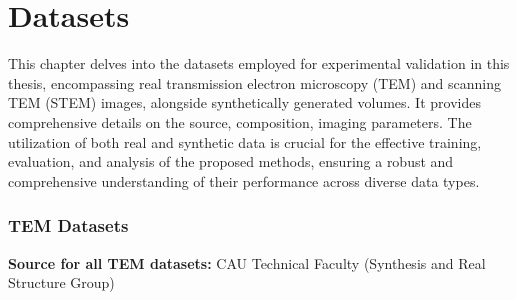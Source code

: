 \chapter{Datasets}\label{ch:Datasets}


This chapter delves into the datasets employed for experimental validation in this thesis, encompassing real transmission electron microscopy (TEM) and scanning TEM (STEM) images, alongside synthetically generated volumes. It provides comprehensive details on the source, composition, imaging parameters. The utilization of both real and synthetic data is crucial for the effective training, evaluation, and analysis of the proposed methods, ensuring a robust and comprehensive understanding of their performance across diverse data types.


\subsection{TEM Datasets}
    \textbf{Source for all TEM datasets:} CAU Technical Faculty (Synthesis and Real Structure Group)
    
